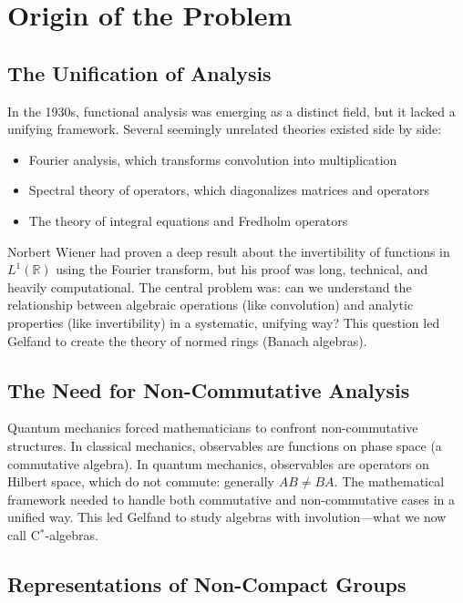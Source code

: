 \section{Origin of the Problem}

\subsection{The Unification of Analysis}

In the 1930s, functional analysis was emerging as a distinct field, but it lacked a unifying framework. Several seemingly unrelated theories existed side by side:
\begin{itemize}
    \item Fourier analysis, which transforms convolution into multiplication
    \item Spectral theory of operators, which diagonalizes matrices and operators
    \item The theory of integral equations and Fredholm operators
\end{itemize}

Norbert Wiener had proven a deep result about the invertibility of functions in $L^1(\mathbb{R})$ using the Fourier transform, but his proof was long, technical, and heavily computational. The central problem was: can we understand the relationship between algebraic operations (like convolution) and analytic properties (like invertibility) in a systematic, unifying way? This question led Gelfand to create the theory of normed rings (Banach algebras).

\subsection{The Need for Non-Commutative Analysis}

Quantum mechanics forced mathematicians to confront non-commutative structures. In classical mechanics, observables are functions on phase space (a commutative algebra). In quantum mechanics, observables are operators on Hilbert space, which do not commute: generally $AB \neq BA$. The mathematical framework needed to handle both commutative and non-commutative cases in a unified way. This led Gelfand to study algebras with involution---what we now call C$^*$-algebras.

\subsection{Representations of Non-Compact Groups}

